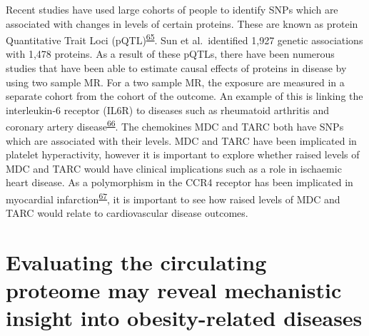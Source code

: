 \documentclass[11pt,twoside]{bristolthesis}
\begin{document}
Recent studies have used large cohorts of people to identify SNPs which are associated with changes in levels of certain proteins. These are known as protein Quantitative Trait Loci (pQTL)\textsuperscript{\protect\hyperlink{ref-Sun2018}{65}}. Sun et al.~identified 1,927 genetic associations with 1,478 proteins. As a result of these pQTLs, there have been numerous studies that have been able to estimate causal effects of proteins in disease by using two sample MR. For a two sample MR, the exposure are measured in a separate cohort from the cohort of the outcome. An example of this is linking the interleukin-6 receptor (IL6R) to diseases such as rheumatoid arthritis and coronary artery disease\textsuperscript{\protect\hyperlink{ref-Bretherick2020}{66}}. The chemokines MDC and TARC both have SNPs which are associated with their levels. MDC and TARC have been implicated in platelet hyperactivity, however it is important to explore whether raised levels of MDC and TARC would have clinical implications such as a role in ischaemic heart disease. As a polymorphism in the CCR4 receptor has been implicated in myocardial infarction\textsuperscript{\protect\hyperlink{ref-Noori2018}{67}}, it is important to see how raised levels of MDC and TARC would relate to cardiovascular disease outcomes.

\hypertarget{evaluating-the-circulating-proteome-may-reveal-mechanistic-insight-into-obesity-related-diseases}{%
\section{Evaluating the circulating proteome may reveal mechanistic insight into obesity-related diseases}\label{evaluating-the-circulating-proteome-may-reveal-mechanistic-insight-into-obesity-related-diseases}}
\end{document}
